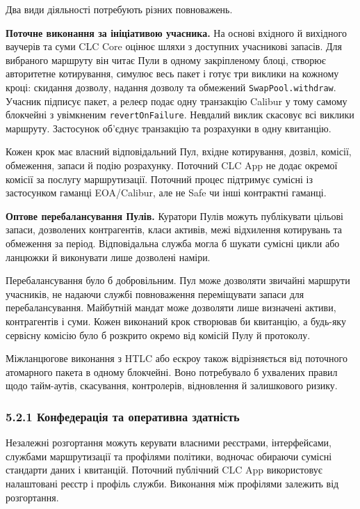 \documentclass[11pt]{article}
\begin{document}
Два види діяльності потребують різних повноважень.

\textbf{Поточне виконання за ініціативою учасника.} На основі вхідного й вихідного ваучерів та суми CLC Core оцінює шляхи з доступних учасникові запасів. Для вибраного маршруту він читає Пули в одному закріпленому блоці, створює авторитетне котирування, симулює весь пакет і готує три виклики на кожному кроці: скидання дозволу, надання дозволу та обмежений \texttt{SwapPool.withdraw}. Учасник підписує пакет, а релеєр подає одну транзакцію Calibur у тому самому блокчейні з увімкненим \texttt{revertOnFailure}. Невдалий виклик скасовує всі виклики маршруту. Застосунок об'єднує транзакцію та розрахунки в одну квитанцію.

Кожен крок має власний відповідальний Пул, вхідне котирування, дозвіл, комісії, обмеження, запаси й подію розрахунку. Поточний CLC App не додає окремої комісії за послугу маршрутизації. Поточний процес підтримує сумісні із застосунком гаманці EOA/Calibur, але не Safe чи інші контрактні гаманці.

\textbf{Оптове перебалансування Пулів.} Куратори Пулів можуть публікувати цільові запаси, дозволених контрагентів, класи активів, межі відхилення котирувань та обмеження за період. Відповідальна служба могла б шукати сумісні цикли або ланцюжки й виконувати лише дозволені наміри.

Перебалансування було б добровільним. Пул може дозволяти звичайні маршрути учасників, не надаючи службі повноваження переміщувати запаси для перебалансування. Майбутній мандат може дозволяти лише визначені активи, контрагентів і суми. Кожен виконаний крок створював би квитанцію, а будь-яку сервісну комісію було б розкрито окремо від комісій Пулу й протоколу.

Міжланцюгове виконання з HTLC або ескроу також відрізняється від поточного атомарного пакета в одному блокчейні. Воно потребувало б ухвалених правил щодо тайм-аутів, скасування, контролерів, відновлення й залишкового ризику.

\subsubsection*{5.2.1 Конфедерація та оперативна здатність}

Незалежні розгортання можуть керувати власними реєстрами, інтерфейсами, службами маршрутизації та профілями політики, водночас обираючи сумісні стандарти даних і квитанцій. Поточний публічний CLC App використовує налаштовані реєстр і профіль служби. Виконання між профілями залежить від розгортання.
\end{document}
